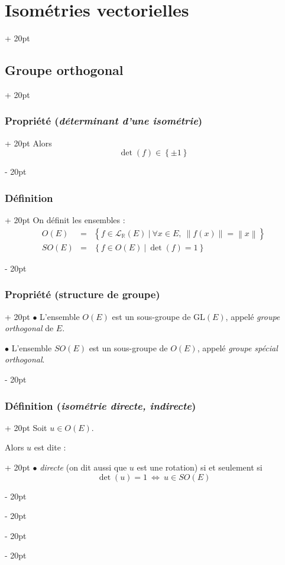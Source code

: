 \documentclass[a4paper, 12pt, twoside]{article}
\newcommand{\R}{\mathbb{R}} %
\newcommand{\set}[1]{\left\{ #1 \right\}}
\newcommand{\norm}[1]{\left\lVert #1 \right\rVert}
\newcommand{\ssi}{\ \Leftrightarrow \ }
\newcommand{\ind}[1][20pt]{\advance\leftskip + #1}
\newcommand{\deind}[1][20pt]{\advance\leftskip - #1}
\newenvironment{indt}[2][20pt]{#2 \par \ind[#1]}{\par \deind} %
\begin{document}
\begin{indt}{\section{Isométries vectorielles}}
\begin{indt}{\subsection{Groupe orthogonal}}
\begin{indt}{\subsubsection{Propriété (\textit{déterminant d'une isométrie})}}
                Alors
                \[
                    \det(f) \in \set{\pm 1}
                \]
            \end{indt}

            \vspace{12pt}
            
            \begin{indt}{\subsubsection{Définition}}
                On définit les ensembles :
                \[
                    \begin{array}{rcl}
                        O(E)
                        &=& \set{f \in \mathcal L_\R(E)\ |\ \forall x \in E,\ \norm{f(x)} = \norm x}
                        \\
                        SO(E)
                        &=& \set{f \in O(E)\ |\ \det(f) = 1}
                    \end{array}
                \]
            \end{indt}

            \vspace{12pt}
            
            \begin{indt}{\subsubsection{Propriété (structure de groupe)}}
                $\bullet$ L'ensemble $O(E)$ est un sous-groupe de $\mathrm{GL}(E)$, appelé \emph{groupe orthogonal} de $E$.

                $\bullet$ L'ensemble $SO(E)$ est un sous-groupe de $O(E)$, appelé \emph{groupe spécial orthogonal}.
            \end{indt}

            \vspace{12pt}
            
            \begin{indt}{\subsubsection{Définition (\textit{isométrie directe, indirecte})}}
                Soit $u \in O(E)$.

                \begin{indt}{Alors $u$ est dite :}
                    $\bullet$ \emph{directe} (on dit aussi que $u$ est une rotation) si et seulement si
                    \[
                        \det(u) = 1 \ssi u \in SO(E)
                    \]


\end{indt}
\end{indt}
\end{indt}
\end{indt}
\end{document}
